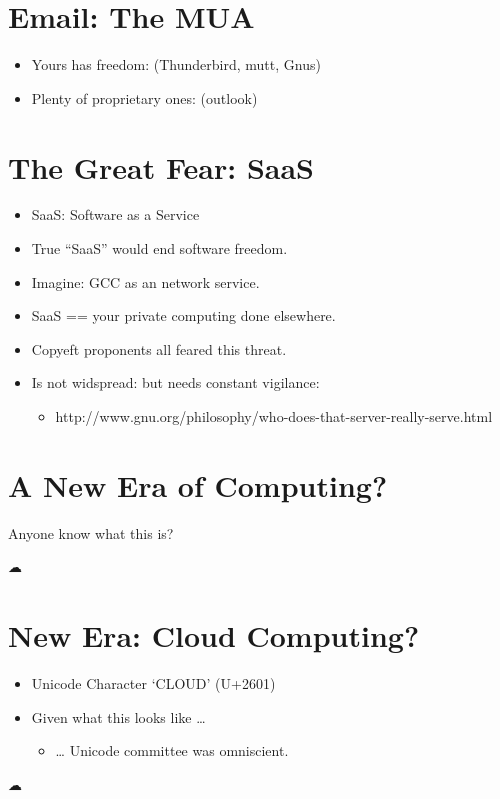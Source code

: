 \documentclass{article}
\begin{document}
\section{Email: The MUA}

\begin{itemize}
\item 
  Yours has freedom: (Thunderbird, mutt, Gnus)

\item 
  Plenty of proprietary ones: (outlook)

\end{itemize}
\section{The Great Fear: SaaS}

\begin{itemize}
\item 
  SaaS: Software as a Service

\item 
  True “SaaS” would end software freedom.

\item 
  Imagine: GCC as an network service.

\item 
  SaaS == your private computing done elsewhere.

\item 
  Copyeft proponents all feared this threat.

\item 
  Is not widspread: but needs constant vigilance:
  \begin{itemize}
  \item 
    http://www.gnu.org/philosophy/who-does-that-server-really-serve.html
  \end{itemize}
\end{itemize}
\section{A New Era of Computing?}

Anyone know what this is?

☁

\section{New Era: Cloud Computing?}

\begin{itemize}
\item 
  Unicode Character `CLOUD' (U+2601)
\item 
  Given what this looks like …
  \begin{itemize}
  \item 
    … Unicode committee was omniscient.
  \end{itemize}
\end{itemize}
☁
\end{document}
